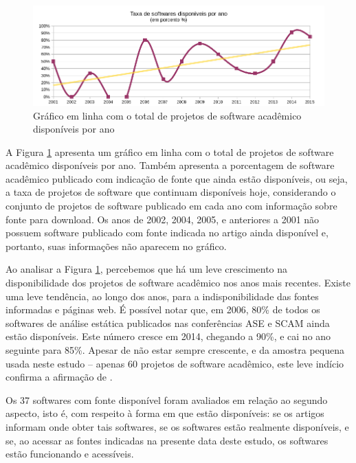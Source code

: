 \begin{figure}[h]
  \center
  \includegraphics[scale=0.65]{imagens/softwares-disponivel-por-ano.png}
  \caption{Gráfico em linha com o total de projetos de software acadêmico disponíveis por ano}
  \label{softwares-disponivel-por-ano}
\end{figure}

A Figura \ref{softwares-disponivel-por-ano} apresenta 
um gráfico em linha com o total de projetos de software acadêmico disponíveis por ano.
Também apresenta a porcentagem de software acadêmico publicado com indicação de fonte que ainda estão
disponíveis, ou seja, a taxa de projetos de software que continuam
disponíveis hoje, considerando o conjunto de projetos de software publicado em cada ano 
com informação sobre fonte para download. 
Os anos de 2002, 2004, 2005, e anteriores a 2001 não possuem software publicado
com fonte indicada no artigo ainda disponível e, portanto,
suas informações não aparecem no gráfico.

Ao analisar a Figura \ref{softwares-disponivel-por-ano},
percebemos que há um leve crescimento na disponibilidade
dos projetos de software acadêmico  nos anos mais recentes.
%
Existe uma leve tendência, ao longo dos anos,  
para a indisponibilidade das fontes informadas e páginas web.
É possível notar que, em 2006, 80\% de todos os
softwares de análise estática publicados nas conferências ASE e SCAM ainda estão disponíveis.
Este número cresce em 2014, chegando a 90\%, e cai no ano seguinte para 85\%.
Apesar de não estar sempre crescente, e da  amostra pequena usada neste estudo 
-- apenas 60 projetos de software acadêmico,
este leve indício confirma a afirmação de .

Os 37 softwares com fonte disponível foram avaliados em relação ao segundo
aspecto, isto é, com respeito à forma em que estão disponíveis:
se os artigos informam onde obter tais softwares, se os softwares estão realmente disponíveis, e 
se, ao acessar as fontes indicadas na presente data deste estudo, os softwares estão funcionando e
acessíveis.

